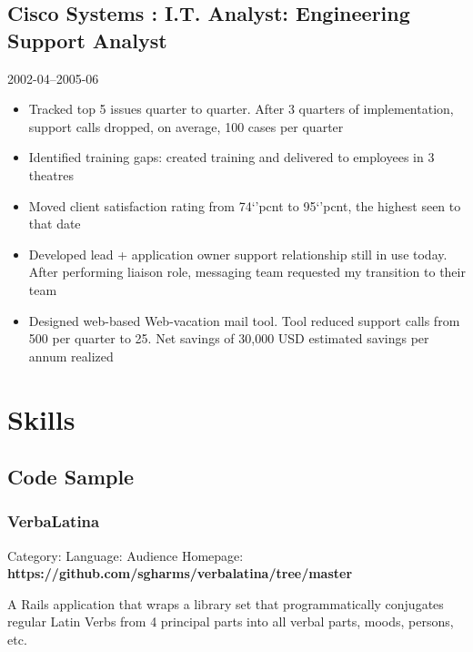 \documentclass[]{article}
\begin{document}
\subsection*{Cisco Systems : I.T. Analyst: Engineering Support Analyst}
  \label{ciscosystems_rdfa_cisco_2_title:_rdfa_cisco_2_desc}
  2002-04--2005-06
\begin{itemize}
    \item{Tracked top 5 issues quarter to quarter. After 3 quarters of implementation, support calls dropped, on average, 100 cases per quarter}
    \item{Identified training gaps: created training and delivered to employees in 3 theatres}
    \item{Moved client satisfaction rating from 74`'pcnt to 95`'pcnt, the highest seen to that date}
    \item{Developed lead + application owner support relationship still in use today. After performing liaison role, messaging team requested my transition to their team}
    \item{Designed web-based Web-vacation mail tool. Tool reduced support calls from 500 per quarter to 25. Net savings of 30,000 USD estimated savings per annum realized
}
\end{itemize}
       


\section*{Skills}










  \subsection*{ Code Sample }





\subsubsection*{VerbaLatina}
Category:  Language: Audience
Homepage: {\bf https://github.com/sgharms/verbalatina/tree/master}
\vspace{0.05in}

A Rails application that wraps a library set that programmatically conjugates regular Latin Verbs from 4 principal parts into all verbal parts, moods, persons, etc.
\end{document}

